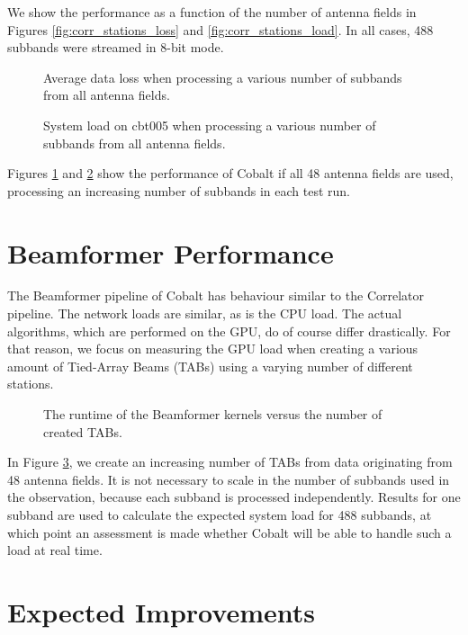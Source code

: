 \documentclass{report}
\begin{document}
We show the performance as a function of the number of antenna fields in Figures \ref{fig:corr_stations_loss} and \ref{fig:corr_stations_load}. In all cases, 488 subbands were streamed in 8-bit mode.

\begin{figure}
\centering
\caption{Average data loss when processing a various number of subbands from all antenna fields.}
\label{fig:corr_subbands_loss}
\end{figure}

\begin{figure}
\centering
\caption{System load on cbt005 when processing a various number of subbands from all antenna fields.}
\label{fig:corr_subbands_load}
\end{figure}

Figures \ref{fig:corr_subbands_loss} and \ref{fig:corr_subbands_load} show the performance of Cobalt if all 48 antenna fields are used, processing an increasing number of subbands in each test run.

\section{Beamformer Performance}

The Beamformer pipeline of Cobalt has behaviour similar to the Correlator pipeline. The network loads are similar, as is the CPU load. The actual algorithms, which are performed on the GPU, do of course differ drastically. For that reason, we focus on measuring the GPU load when creating a various amount of Tied-Array Beams (TABs) using a varying number of different stations.

\begin{figure}
\centering
\caption{The runtime of the Beamformer kernels versus the number of created TABs.}
\label{fig:bf_tabs}
\end{figure}

In Figure \ref{fig:bf_tabs}, we create an increasing number of TABs from data originating from 48 antenna fields. It is not necessary to scale in the number of subbands used in the observation, because each subband is processed independently. Results for one subband are used to calculate the expected system load for 488 subbands, at which point an assessment is made whether Cobalt will be able to handle such a load at real time.

\section{Expected Improvements}
\end{document}
